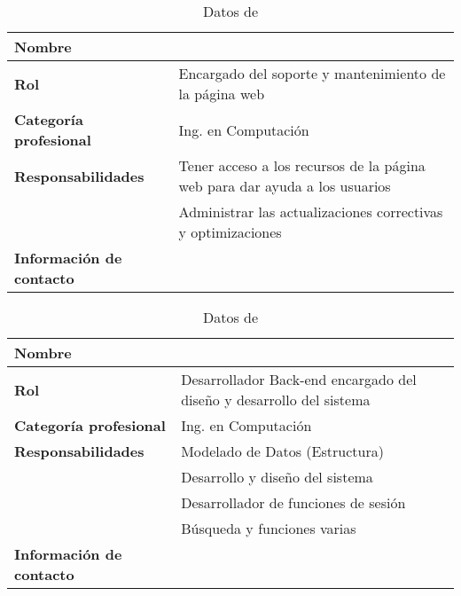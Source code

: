 	\begin{table}[h!]
		\centering
		\begin{tabular}{|l|p{10cm}|}
			\hline
			\textbf{Nombre}                  & \dAuthor                                                                   \\
			\hline
			\textbf{Rol}                     & Encargado del soporte y mantenimiento de la página web                     \\
			\hline
			\textbf{Categoría profesional}   & Ing. en Computación                                                        \\
			\hline
			\textbf{Responsabilidades}       & Tener acceso a los recursos de la página web para dar ayuda a los usuarios \\
			                                 & Administrar las actualizaciones correctivas y optimizaciones               \\
			\hline
			\textbf{Información de contacto} & \dAuthorMail                                                               \\
			\hline
		\end{tabular}
		\caption{Datos de \dAuthor}
	\end{table}

	\begin{table}[h!]
		\centering
		\begin{tabular}{|l|p{10cm}|}
			\hline
			\textbf{Nombre}                  & \theAuthor                                                           \\
			\hline
			\textbf{Rol}                     & Desarrollador Back-end encargado del diseño y desarrollo del sistema \\
			\hline
			\textbf{Categoría profesional}   & Ing. en Computación                                                  \\
			\hline
			\textbf{Responsabilidades}       & Modelado de Datos (Estructura)                                       \\
			                                 & Desarrollo y diseño del sistema                                      \\
			                                 & Desarrollador de funciones de sesión                                 \\
			                                 & Búsqueda y funciones varias                                          \\
			\hline
			\textbf{Información de contacto} & \theAuthorMail                                                       \\
			\hline
		\end{tabular}
		\caption{Datos de \theAuthor}
	\end{table}

